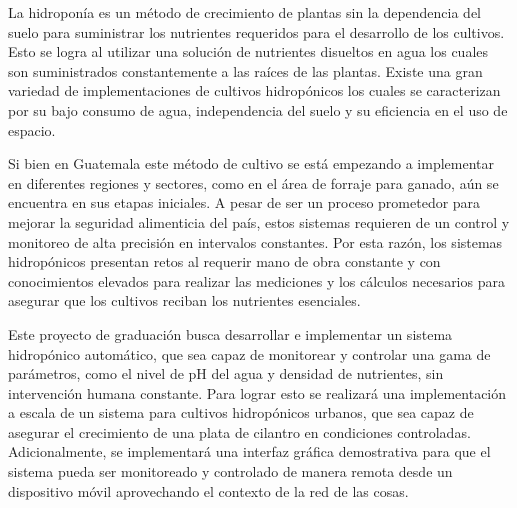 La hidroponía es un método de crecimiento de plantas sin la dependencia del suelo para suministrar los nutrientes requeridos para el desarrollo de los cultivos. Esto se logra al utilizar una solución de nutrientes disueltos en agua los cuales son suministrados constantemente a las raíces de las plantas. Existe una gran variedad de implementaciones de cultivos hidropónicos los cuales se caracterizan por su bajo consumo de agua, independencia del suelo y su eficiencia en el uso de espacio.

Si bien en Guatemala este método de cultivo se está empezando a implementar en diferentes regiones y sectores, como en el área de forraje para ganado, aún se encuentra en sus etapas iniciales. A pesar de ser un proceso prometedor para mejorar la seguridad alimenticia del país, estos sistemas requieren de un control y monitoreo de alta precisión en intervalos constantes. Por esta razón, los sistemas hidropónicos presentan retos al requerir mano de obra constante y con conocimientos elevados para realizar las mediciones y los cálculos necesarios para asegurar que los cultivos reciban los nutrientes esenciales.

Este proyecto de graduación busca desarrollar e implementar un sistema hidropónico automático, que sea capaz de monitorear y controlar una gama de parámetros, como el nivel de pH del agua y densidad de nutrientes, sin intervención humana constante. Para lograr esto se realizará una implementación a escala de un sistema para cultivos hidropónicos urbanos, que sea capaz de asegurar el crecimiento de una plata de cilantro en condiciones controladas. Adicionalmente, se implementará una interfaz gráfica demostrativa para que el sistema pueda ser monitoreado y controlado de manera remota desde un dispositivo móvil aprovechando el contexto de la red de las cosas.




